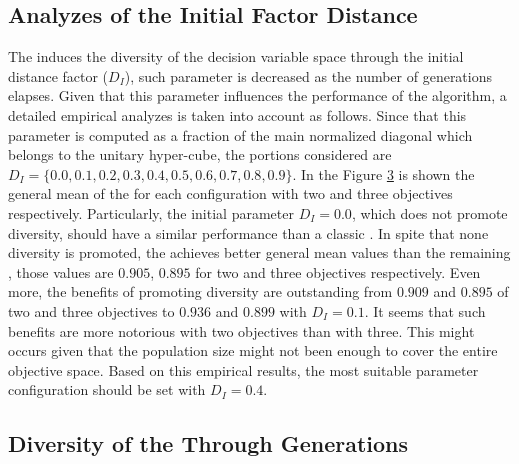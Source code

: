 \begin{figure}[t]
\centering

\label{fig:variable-decision-scalability-2obj}
\end{figure}

\begin{figure}[t]
\centering

\label{fig:variable-decision-scalability-3obj}
\end{figure}

\subsection{Analyzes of the Initial Factor Distance}

The \VSDMOEA{} induces the diversity of the decision variable space through the initial distance factor ($D_I$), such parameter is decreased as the number of generations elapses.
%
Given that this parameter influences the performance of the algorithm, a detailed empirical analyzes is taken into account as follows.
%
Since that this parameter is computed as a fraction of the main normalized diagonal which belongs to the unitary hyper-cube, the portions considered are $ D_I = \{0.0, 0.1, 0.2, 0.3, 0.4, 0.5, 0.6, 0.7, 0.8, 0.9\}$.
%
In the Figure \ref{fig:Initial-distance-factor} is shown the general mean of the \HV{} for each configuration with two and three objectives respectively.
%
Particularly, the initial parameter $D_I=0.0$, which does not promote diversity, should have a similar performance than a classic \MOEA{}.
%
In spite that none diversity is promoted, the \VSDMOEA{} achieves better general mean values than the remaining \MOEAS{}, those values are $0.905$, $0.895$ for two and three objectives respectively.
%
Even more, the benefits of promoting diversity are outstanding from $0.909$ and $0.895$ of two and three objectives to $0.936$ and $0.899$ with $D_I=0.1$.
%
It seems that such benefits are more notorious with two objectives than with three.
%
This might occurs given that the population size might not been enough to cover the entire objective space.
%
Based on this empirical results, the most suitable parameter configuration should be set with $D_I = 0.4$.
%
\begin{figure}[t]
\centering

\label{fig:Initial-distance-factor}
\end{figure}

\subsection{Diversity of the \MOEAS{} Through Generations}

